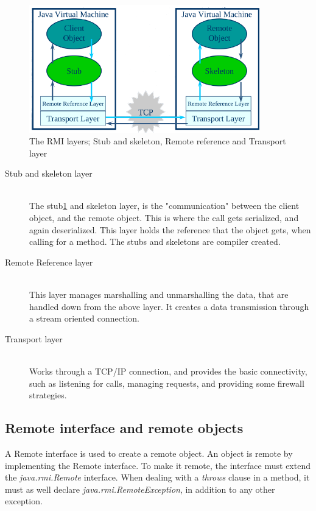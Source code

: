 \begin{figure}[ht!]
\centering
\includegraphics[width=100mm]{img/RMI_layer.png}
\caption{The RMI layers; Stub and skeleton, Remote reference and Transport layer}
\label{Remote Layers}
\end{figure}

\begin{description}
 \item[Stub and skeleton layer] \hfill \\
The stub\ref{Remote Layers} and skeleton layer, is the "communication" between the client object, and the remote object. This is where the call gets serialized, and again deserialized. This layer holds the reference that the object gets, when calling for a method. The stubs and skeletons are compiler created.

 \item[Remote Reference layer] \hfill \\
This layer manages marshalling and unmarshalling the data, that are handled down from the above layer. It creates a data transmission through a stream oriented connection.

 \item[Transport layer] \hfill \\
Works through a TCP/IP connection, and provides the basic connectivity, such as listening for calls, managing requests, and providing some firewall strategies.
\end{description}

\subsection{Remote interface and remote objects}


A Remote interface is used to create a remote object. An object is remote by implementing the Remote interface. To make it remote, the interface must extend the \emph{java.rmi.Remote} interface. When dealing with a \emph{throws} clause in a method, it must as well declare \emph{java.rmi.RemoteException}, in addition to any other exception.\\

